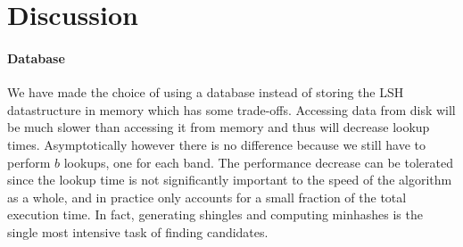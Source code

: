 \section{Discussion}


\paragraph{Database}
We have made the choice of using a database instead of storing the LSH datastructure in memory which has some trade-offs. Accessing data from disk will be much slower than accessing it from memory and thus will decrease lookup times. Asymptotically however there is no difference because we still have to perform $b$ lookups, one for each band. The performance decrease can be tolerated since the lookup time is not significantly important to the speed of the algorithm as a whole, and in practice only accounts for a small fraction of the total execution time. In fact, generating shingles and computing minhashes is the single most intensive task of finding candidates.


